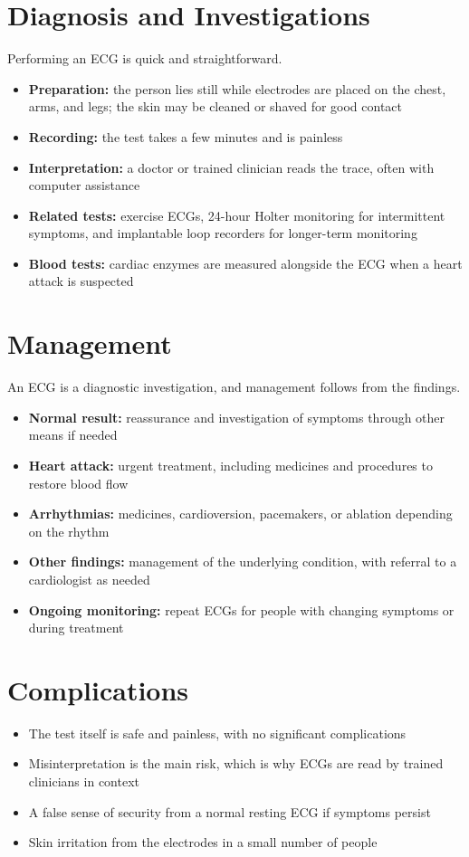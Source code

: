 \section*{Diagnosis and Investigations}
Performing an ECG is quick and straightforward.
\begin{itemize}
    \item \textbf{Preparation:} the person lies still while electrodes are placed on the chest, arms, and legs; the skin may be cleaned or shaved for good contact
    \item \textbf{Recording:} the test takes a few minutes and is painless
    \item \textbf{Interpretation:} a doctor or trained clinician reads the trace, often with computer assistance
    \item \textbf{Related tests:} exercise ECGs, 24-hour Holter monitoring for intermittent symptoms, and implantable loop recorders for longer-term monitoring
    \item \textbf{Blood tests:} cardiac enzymes are measured alongside the ECG when a heart attack is suspected
\end{itemize}

\section*{Management}
An ECG is a diagnostic investigation, and management follows from the findings.
\begin{itemize}
    \item \textbf{Normal result:} reassurance and investigation of symptoms through other means if needed
    \item \textbf{Heart attack:} urgent treatment, including medicines and procedures to restore blood flow
    \item \textbf{Arrhythmias:} medicines, cardioversion, pacemakers, or ablation depending on the rhythm
    \item \textbf{Other findings:} management of the underlying condition, with referral to a cardiologist as needed
    \item \textbf{Ongoing monitoring:} repeat ECGs for people with changing symptoms or during treatment
\end{itemize}

\section*{Complications}
\begin{itemize}
    \item The test itself is safe and painless, with no significant complications
    \item Misinterpretation is the main risk, which is why ECGs are read by trained clinicians in context
    \item A false sense of security from a normal resting ECG if symptoms persist
    \item Skin irritation from the electrodes in a small number of people
\end{itemize}

